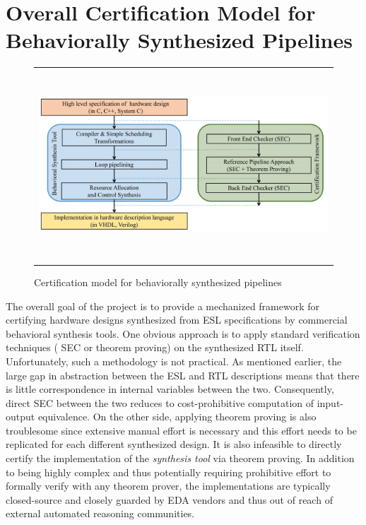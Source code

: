 \section{Overall Certification Model for Behaviorally Synthesized Pipelines}

\begin{figure}[t!]
\begin{center}
\begin{tabular}{c}
\includegraphics[height=2.8in]{fig-proposal/certification-framework}
\end{tabular}
\end{center}
\caption{Certification model for behaviorally synthesized pipelines}
\label{fig:certification-framework}
\end{figure}

The overall goal of the project is to provide a mechanized framework
for certifying hardware designs synthesized from ESL specifications by
commercial behavioral synthesis tools.
One obvious approach is to apply standard verification techniques (%
SEC or
theorem proving) on the synthesized RTL itself.
Unfortunately, such a methodology is not practical.
As mentioned earlier, the large gap in abstraction
between the ESL and RTL descriptions means that there is little
correspondence in internal variables between the two.  Consequently,
direct SEC between the two reduces to cost-prohibitive computation of
input-output equivalence. On the other side, applying theorem proving
is also troublesome since extensive manual effort is necessary and
this effort needs to be replicated for each different synthesized
design. It is also infeasible to
directly certify the implementation of the {\em synthesis tool} via
theorem proving.  In addition to being highly complex and thus
potentially requiring prohibitive effort to formally verify with any
theorem prover, the implementations are typically closed-source and
closely guarded by EDA vendors and thus out of reach of external
automated reasoning communities.

